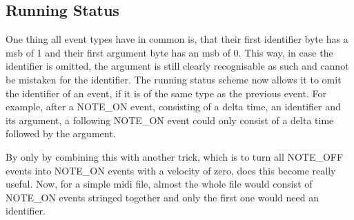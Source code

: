 \subsection{Running Status}

One thing all event types have in common is, that their first identifier byte has a \gls{msb} of 1 and their first argument byte has an \gls{msb} of 0. This way, in case the identifier is omitted, the argument is still clearly recognisable as such and cannot be mistaken for the identifier. The running status scheme now allows it to omit the identifier of an event, if it is of the same type as the previous event. For example, after a \newline NOTE\_ON event, consisting of a delta time, an identifier and its argument, a following NOTE\_ON event could only consist of a delta time followed by the argument.

By only by combining this with another trick, which is to turn all NOTE\_OFF events into NOTE\_ON events with a velocity of zero, does this become really useful. Now, for a simple \gls{midi} file, almost the whole file would consist of NOTE\_ON events stringed together and only the first one would need an identifier.

